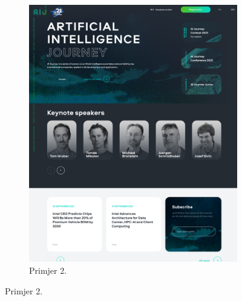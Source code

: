\begin{figure}[H]
\begin{subfigure}{0.4\linewidth}
				\includegraphics[width=\linewidth]{slike/frontpage_example2}
				\caption{Primjer 2.}
				\label{frontpage_example2}
			\end{subfigure}
		\end{figure}
	
